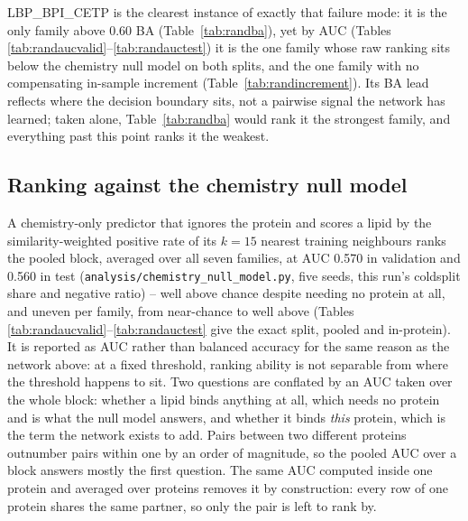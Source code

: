 LBP\_BPI\_CETP is the clearest instance of exactly that failure mode: it is the only
family above 0.60 BA (Table~\ref{tab:randba}), yet by AUC (Tables
\ref{tab:randaucvalid}--\ref{tab:randauctest}) it is the one family whose raw ranking
sits below the chemistry null model on both splits, and the one family with no
compensating in-sample increment (Table~\ref{tab:randincrement}). Its BA lead reflects
where the decision boundary sits, not a pairwise signal the network has learned; taken
alone, Table~\ref{tab:randba} would rank it the strongest family, and everything past
this point ranks it the weakest.

\subsection{Ranking against the chemistry null model}

A chemistry-only predictor that ignores the protein and scores a lipid by the
similarity-weighted positive rate of its $k = 15$ nearest training neighbours ranks the
pooled block, averaged over all seven families, at AUC 0.570 in validation and 0.560 in
test (\texttt{analysis/chemistry\_null\_model.py}, five seeds, this run's coldsplit
share and negative ratio) -- well above chance despite needing no protein at all, and
uneven per family, from near-chance to well above (Tables
\ref{tab:randaucvalid}--\ref{tab:randauctest} give the exact split, pooled and
in-protein). It is reported as AUC rather than balanced accuracy for the same reason as
the network above: at a fixed threshold, ranking ability is not separable from where the
threshold happens to sit. Two questions
are conflated by an AUC taken over the whole block: whether a lipid binds
anything at all, which needs no protein and is what the null model answers, and whether
it binds \emph{this} protein, which is the term the network exists to add. Pairs between
two different proteins outnumber pairs within one by an order of magnitude, so the
pooled AUC over a block answers mostly the first question. The same AUC computed inside
one protein and averaged over proteins removes it by construction: every row of one
protein shares the same partner, so only the pair is left to rank by.

